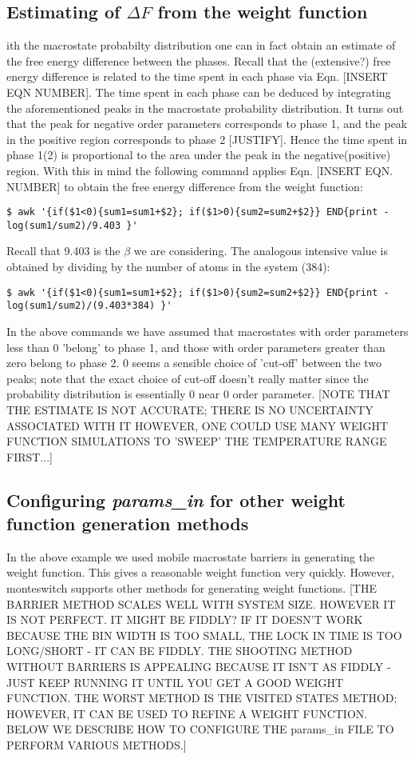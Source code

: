 \documentclass{report}
\begin{document}
\subsection{Estimating of $\Delta F$ from the weight function}
ith the macrostate probabilty distribution one can in fact obtain an estimate of the free energy difference between the phases. Recall that the
(extensive?) free energy difference is related to the time spent in each phase via Eqn. [INSERT EQN NUMBER]. The time spent in each phase can be deduced by
integrating the aforementioned peaks in the macrostate probability distribution. It turns out that the peak for negative order parameters corresponds
to phase 1, and the peak in the positive region corresponds to phase 2 [JUSTIFY]. Hence the time spent in phase 1(2) is proportional to the area under
the peak in the negative(positive) region. With this in mind the following command applies Eqn. [INSERT EQN. NUMBER] to obtain the free energy difference
from the weight function:
\begin{verbatim}
$ awk '{if($1<0){sum1=sum1+$2}; if($1>0){sum2=sum2+$2}} END{print -log(sum1/sum2)/9.403 }'
\end{verbatim}
Recall that 9.403 is the $\beta$ we are considering. The analogous intensive value is obtained by dividing by the number of atoms in the system (384):
\begin{verbatim}
$ awk '{if($1<0){sum1=sum1+$2}; if($1>0){sum2=sum2+$2}} END{print -log(sum1/sum2)/(9.403*384) }'
\end{verbatim}
In the above commands we have assumed that macrostates with order parameters less than 0 'belong' to phase 1, and those with order parameters greater
than zero belong to phase 2. 0 seems a sensible choice of 'cut-off' between the two peaks; note that the exact choice of cut-off doesn't really matter
since the probability distribution is essentially 0 near 0 order parameter.
[NOTE THAT THE ESTIMATE IS NOT ACCURATE; THERE IS NO UNCERTAINTY ASSOCIATED WITH IT HOWEVER, ONE COULD USE MANY WEIGHT FUNCTION SIMULATIONS TO 'SWEEP'
THE TEMPERATURE RANGE FIRST...]

\subsection{Configuring \emph{params\_in} for other weight function generation methods}
In the above example we used mobile macrostate barriers in generating the weight function. This gives a reasonable weight function very quickly.
However, monteswitch supports other methods for generating weight functions. [THE BARRIER METHOD SCALES WELL WITH SYSTEM SIZE. HOWEVER IT IS NOT PERFECT.
IT MIGHT BE FIDDLY? IF IT DOESN'T WORK BECAUSE THE BIN WIDTH IS TOO SMALL, THE LOCK IN TIME IS TOO LONG/SHORT - IT CAN BE FIDDLY. THE SHOOTING METHOD
WITHOUT BARRIERS IS APPEALING BECAUSE IT ISN'T AS FIDDLY - JUST KEEP RUNNING IT UNTIL YOU GET A GOOD WEIGHT FUNCTION. THE WORST METHOD IS THE VISITED
STATES METHOD; HOWEVER, IT CAN BE USED TO REFINE A WEIGHT FUNCTION. BELOW WE DESCRIBE HOW TO CONFIGURE THE params\_in FILE TO PERFORM VARIOUS METHODS.]
\end{document}
